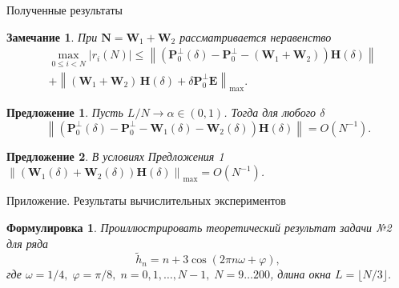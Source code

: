\documentclass[notheorems, handout]{beamer}
\newtheorem{remark}{Замечание}
\newtheorem{sentence}{Предложение}
\newtheorem{formulation}{Формулировка}
\newcommand{\norm}[1]{\left\|#1\right\|}
\begin{document}
	\begin{frame}{Полученные результаты}
		\begin{remark}
			При $\mathbf{N}=\mathbf{W}_1 + \mathbf{W}_2$ рассматривается неравенство
			\begin{align*}
				&\max_{0\leqslant i<N} |r_i(N)|\leqslant \norm{\left(\mathbf{P}_0^\bot(\delta)- \mathbf{P}_0^\bot-(\mathbf{W}_1+\mathbf{W}_2)\right)\mathbf{H}(\delta)}
				\\
				&+\norm{(\mathbf{W}_1+\mathbf{W}_2)\, \mathbf{H}(\delta) + \delta \mathbf{P}_0^\perp \mathbf{E}}_{\max}.
			\end{align*}
		\end{remark}
		\begin{sentence}
			Пусть $L/N\rightarrow\alpha\in(0,1)$. Тогда для любого $\delta$
			\begin{equation*}
				\norm{\left(\mathbf{P}_0^\bot(\delta) - \mathbf{P}_0^\bot - \mathbf{W}_1(\delta) - \mathbf{W}_2(\delta)\right)\mathbf{H}(\delta)} = O(N^{-1}).
			\end{equation*}
		\end{sentence}
		\begin{sentence}
			В условиях Предложения 1 $\norm{(\mathbf{W}_1(\delta)+\mathbf{W}_2(\delta))\mathbf{H}(\delta)}_{\max}=O(N^{-1})$.
		\end{sentence}
	\end{frame}
	\begin{frame}{Приложение. Результаты вычислительных экспериментов}
		\begin{formulation}
			\textit{Проиллюстрировать теоретический результат задачи №2 для ряда
				\begin{equation*}
					\widetilde{h}_n = n + 3\cos(2\pi n\omega + \varphi),
				\end{equation*}
				где $\omega = 1/4,\;\varphi = \pi/8,\;n=0,1,\dots,N-1,\;N=9\dots200$, длина окна $L=\lfloor N/3\rfloor$.}
		\end{formulation}
	\end{frame}
\end{document}

